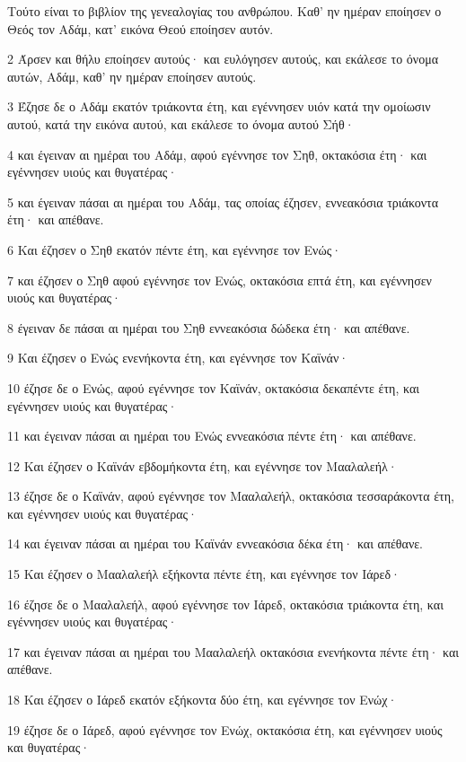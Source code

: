 \par Τούτο είναι το βιβλίον της γενεαλογίας του ανθρώπου. Καθ' ην ημέραν εποίησεν ο Θεός τον Αδάμ, κατ' εικόνα Θεού εποίησεν αυτόν.
\par 2 Άρσεν και θήλυ εποίησεν αυτούς· και ευλόγησεν αυτούς, και εκάλεσε το όνομα αυτών, Αδάμ, καθ' ην ημέραν εποίησεν αυτούς.
\par 3 Έζησε δε ο Αδάμ εκατόν τριάκοντα έτη, και εγέννησεν υιόν κατά την ομοίωσιν αυτού, κατά την εικόνα αυτού, και εκάλεσε το όνομα αυτού Σήθ·
\par 4 και έγειναν αι ημέραι του Αδάμ, αφού εγέννησε τον Σηθ, οκτακόσια έτη· και εγέννησεν υιούς και θυγατέρας·
\par 5 και έγειναν πάσαι αι ημέραι του Αδάμ, τας οποίας έζησεν, εννεακόσια τριάκοντα έτη· και απέθανε.
\par 6 Και έζησεν ο Σηθ εκατόν πέντε έτη, και εγέννησε τον Ενώς·
\par 7 και έζησεν ο Σηθ αφού εγέννησε τον Ενώς, οκτακόσια επτά έτη, και εγέννησεν υιούς και θυγατέρας·
\par 8 έγειναν δε πάσαι αι ημέραι του Σηθ εννεακόσια δώδεκα έτη· και απέθανε.
\par 9 Και έζησεν ο Ενώς ενενήκοντα έτη, και εγέννησε τον Καϊνάν·
\par 10 έζησε δε ο Ενώς, αφού εγέννησε τον Καϊνάν, οκτακόσια δεκαπέντε έτη, και εγέννησεν υιούς και θυγατέρας·
\par 11 και έγειναν πάσαι αι ημέραι του Ενώς εννεακόσια πέντε έτη· και απέθανε.
\par 12 Και έζησεν ο Καϊνάν εβδομήκοντα έτη, και εγέννησε τον Μααλαλεήλ·
\par 13 έζησε δε ο Καϊνάν, αφού εγέννησε τον Μααλαλεήλ, οκτακόσια τεσσαράκοντα έτη, και εγέννησεν υιούς και θυγατέρας·
\par 14 και έγειναν πάσαι αι ημέραι του Καϊνάν εννεακόσια δέκα έτη· και απέθανε.
\par 15 Και έζησεν ο Μααλαλεήλ εξήκοντα πέντε έτη, και εγέννησε τον Ιάρεδ·
\par 16 έζησε δε ο Μααλαλεήλ, αφού εγέννησε τον Ιάρεδ, οκτακόσια τριάκοντα έτη, και εγέννησεν υιούς και θυγατέρας·
\par 17 και έγειναν πάσαι αι ημέραι του Μααλαλεήλ οκτακόσια ενενήκοντα πέντε έτη· και απέθανε.
\par 18 Και έζησεν ο Ιάρεδ εκατόν εξήκοντα δύο έτη, και εγέννησε τον Ενώχ·
\par 19 έζησε δε ο Ιάρεδ, αφού εγέννησε τον Ενώχ, οκτακόσια έτη, και εγέννησεν υιούς και θυγατέρας·
